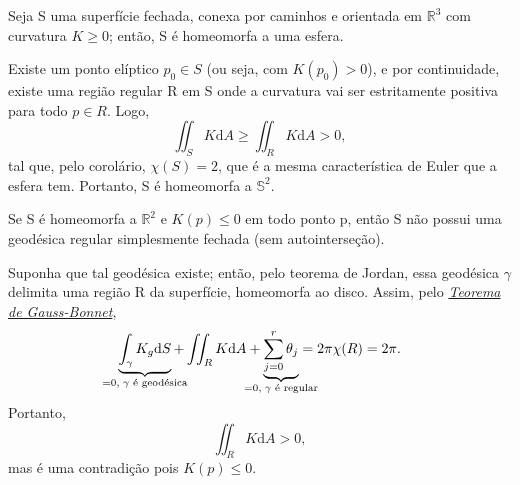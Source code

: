 \documentclass[../differential_geometry.tex]{subfiles}
\begin{document}
\begin{theorem*}
	Seja S uma superfície fechada, conexa por caminhos e orientada em \(\mathbb{R}^{3}\) com curvatura \(K\geq 0\); então, S é homeomorfa a uma esfera.
\end{theorem*}
\begin{proof*}
	Existe um ponto elíptico \(p_{0}\in S\) (ou seja, com \(K(p_{0}) > 0\)), e por continuidade, existe uma região regular R em S onde a curvatura vai ser estritamente positiva para todo \(p\in R\). Logo,
	\[
		\iint_{S}K \mathrm{d}A \geq \iint_{R} K \mathrm{d}A > 0,
	\]
	tal que, pelo corolário, \(\chi (S) = 2\), que é a mesma característica de Euler que a esfera tem. Portanto, S é homeomorfa a \(\mathbb{S}^{2}\). \qedsymbol
\end{proof*}

\begin{theorem*}
	Se S é homeomorfa a \(\mathbb{R}^{2}\) e \(K(p)\leq 0\) em todo ponto p, então S não possui uma geodésica regular simplesmente fechada (sem autointerseção).
\end{theorem*}
\begin{proof*}
	Suponha que tal geodésica existe; então, pelo teorema de Jordan, essa geodésica \(\gamma \) delimita uma região R da superfície, homeomorfa ao disco. Assim, pelo \hyperlink{gauss_bonnet}{\textit{Teorema de Gauss-Bonnet}},
	\[
		\underbrace{\int_{\gamma }^{}K_g \mathrm{d}S}_{\mathclap{=0,\; \gamma\text{ é geodésica}}} + \iint_{R}K\mathrm{d}A + \underbrace{\sum\limits_{j=0}^{r}\theta_{j}}_{\mathclap{=0,\; \gamma \text{ é regular}}} = 2\pi \chi (R) = 2\pi.
	\]
	Portanto,
	\[
		\iint_{R}K \mathrm{d}A >0,
	\]
	mas é uma contradição pois \(K(p) \leq 0\). \qedsymbol
\end{proof*}
\end{document}
